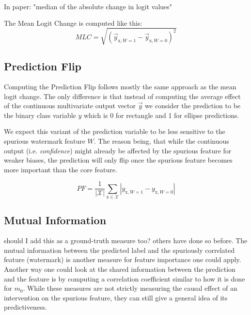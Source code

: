 In \cite{Sixt2022a} paper: "median of the absolute change in logit values"

The Mean Logit Change is computed like this:
\begin{equation}
\displaystyle 
MLC = \sqrt{(\vec{y}_{\mathrm{x}, W=1}- \vec{y}_{\mathrm{x}, W=0})^2}
\end{equation}

\subsection{Prediction Flip}
Computing the Prediction Flip follows mostly the same approach as the mean logit change. The only difference is that instead of computing the average effect of the continuous multivariate output vector $\vec{y}$ we consider the prediction to be the binary class variable $y$ which is 0 for rectangle and 1 for ellipse predictions. 

We expect this variant of the prediction variable to be less sensitive to the spurious watermark feature $W$. The reason being, that while the continuous output (i.e. \textit{confidence}) might already be affected by the spurious feature for weaker biases, the prediction will only flip once the spurious feature becomes more important than the core feature. 

\begin{equation}
\displaystyle 
PF =\frac{1}{|\mathcal{X}|} \sum_{\mathrm{x} \in \mathcal{X}} |y_{\mathrm{x}, W=1} - y_{\mathrm{x}, W=0} |
\end{equation}

\subsection{Mutual Information}
should I add this as a ground-truth measure too? others have done so before.
The mutual information between the predicted label and the spuriously correlated feature (watermark) is another measure for feature importance one could apply. Another way one could look at the shared information between the prediction and the feature is by computing a correlation coefficient similar to how it is done for $m_0$. 
While these measures are not strictly measuring the causal effect of an intervention on the spurious feature, they can still give a general idea of its predictiveness. 

